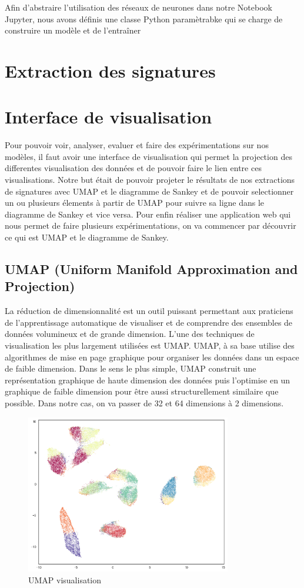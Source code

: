 \documentclass[oneside,13pt,a4paper]{report}
\begin{document}
Afin d'abstraire l'utilisation des réseaux de neurones dans notre Notebook Jupyter, nous avons définis une classe Python paramètrabke qui se charge de construire un modèle et de l'entraîner

\section{Extraction des signatures}

\section{Interface de visualisation}
Pour pouvoir voir, analyser, evaluer et faire des expérimentations sur nos modèles, il faut avoir une interface de visualisation qui permet la projection des differentes visualisation des données et de pouvoir faire le lien entre ces visualisations.
Notre but était de pouvoir projeter le résultats de nos extractions de signatures avec UMAP et le diagramme de Sankey et de pouvoir selectionner un ou plusieurs élements à partir de UMAP pour suivre sa ligne dans le diagramme de Sankey et vice versa.
Pour enfin réaliser une application web qui nous permet de faire plusieurs expérimentations, on va commencer par découvrir ce qui est UMAP et le diagramme de Sankey.
\subsection{UMAP (Uniform Manifold Approximation and Projection)}
La réduction de dimensionnalité est un outil puissant permettant aux praticiens de l'apprentissage automatique de visualiser et de comprendre des ensembles de données volumineux et de grande dimension. L'une des techniques de visualisation les plus largement utilisées est UMAP.
UMAP, à sa base  utilise des algorithmes de mise en page graphique pour organiser les données dans un espace de faible dimension. Dans le sens le plus simple, UMAP construit une représentation graphique de haute dimension des données puis l'optimise en un graphique de faible dimension pour être aussi structurellement similaire que possible. Dans notre cas, on va passer de 32 et 64 dimensions à 2 dimensions.
\begin{figure}[!h]
	\center
	\includegraphics[width=0.8\textwidth]{img/UMAP.png}
	\caption{UMAP visualisation}
\end{figure}
\end{document}
